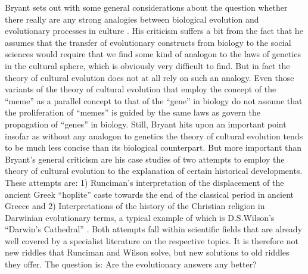 Bryant \label{Bryant_examples} sets out with some general
considerations about the question whether there really are any strong
analogies between biological evolution and evolutionary processes in culture
\cite[p.\ 459-469]{bryant:2004}. His criticism suffers a bit from the
fact that he assumes that the transfer of evolutionary constructs from
biology to the social sciences would require that we find some kind of
analogon to the laws of genetics in the cultural sphere, which is
obviously very difficult to find\cite[p.\ 461ff.]{bryant:2004}.  But in
fact the theory of cultural evolution does not at all rely on such
an analogy. Even those variants of the theory of cultural evolution
that employ the concept of the ``meme'' as a parallel concept to that
of the ``gene'' in biology do not assume that the proliferation of
``memes'' is guided by the same laws as govern the propagation of
``genes'' in biology.  Still, Bryant hits upon an important point
insofar as without any analogon to genetics the theory of cultural
evolution tends to be much less concise than its biological
counterpart. But more important than Bryant's general criticism are
his case studies of two attempts to employ the theory of cultural
evolution to the explanation of certain historical developments.
These attempts are: 1) Runciman's interpretation of the displacement
of the ancient Greek ``hoplite'' caste towards the end of the
classical period in ancient Greece \cite[p.\  470-481]{bryant:2004} and
2) Interpretations of the history of the Christian religion in
Darwinian evolutionary terms, a typical example of which is
D.S.Wilson's ``Darwin's Cathedral'' \cite[]{wilson:2002} \cite[p.\ 
481-488]{bryant:2004}. Both attempts fall within scientific fields
that are already well covered by a specialist literature on the
respective topics. It is therefore not new riddles that Runciman and
Wilson solve, but new solutions to old riddles they offer. The question
is: Are the evolutionary answers any better?

